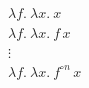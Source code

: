\documentclass{article}
\begin{document}
\begin{center}
	{\Large
		$\lambda f.\ \lambda x.\ x$\\[0.5em]
		$\lambda f.\ \lambda x.\ f\, x$\\[0.3em]
		$\vdots$\\[0.3em]
		$\lambda f.\ \lambda x.\ f^{\circ n}\, x$
	}
\end{center}
\end{document}
